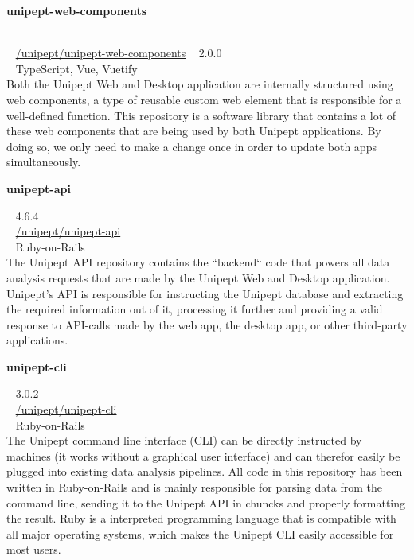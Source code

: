 \begin{large}\textbf{\textsf{unipept-web-components}}\end{large} \\
\faGithub ~ \href{https://github.com/unipept/unipept-web-components}{\textsf{/unipept/unipept-web-components}} \hfill \faTag ~ \textsf{2.0.0} \\
\faCode ~ \textsf{TypeScript, Vue, Vuetify} \\
Both the Unipept Web and Desktop application are internally structured using web components, a type of reusable custom web element that is responsible for a well-defined function.
This repository is a software library that contains a lot of these web components that are being used by both Unipept applications.
By doing so, we only need to make a change once in order to update both apps simultaneously.

\begin{large}\textbf{\textsf{unipept-api}}\end{large} \hfill \faTag ~ \textsf{4.6.4} \\
\faGithub ~ \href{https://github.com/unipept/unipept-api}{\textsf{/unipept/unipept-api}} \\
\faCode ~ \textsf{Ruby-on-Rails} \\
The Unipept API repository contains the ``backend`` code that powers all data analysis requests that are made by the Unipept Web and Desktop application.
Unipept's API is responsible for instructing the Unipept database and extracting the required information out of it, processing it further and providing a valid response to API-calls made by the web app, the desktop app, or other third-party applications.

\begin{large}\textbf{\textsf{unipept-cli}}\end{large} \hfill \faTag ~ \textsf{3.0.2} \\
\faGithub ~ \href{https://github.com/unipept/unipept-cli}{\textsf{/unipept/unipept-cli}} \\
\faCode ~ \textsf{Ruby-on-Rails} \\
The Unipept command line interface (CLI) can be directly instructed by machines (it works without a graphical user interface) and can therefor easily be plugged into existing data analysis pipelines.
All code in this repository has been written in Ruby-on-Rails and is mainly responsible for parsing data from the command line, sending it to the Unipept API in chuncks and properly formatting the result.
Ruby is a interpreted programming language that is compatible with all major operating systems, which makes the Unipept CLI easily accessible for most users.

